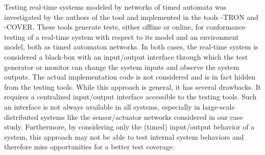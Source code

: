 Testing real-time systems modeled by networks of timed automata was
investigated by the authors of the tool \uppaal
\cite{uppaaltron2008,uppaalcover2007,uppaaltron2005} and implemented
in the tools \uppaal-TRON
and
\uppaal-COVER. These tools generate
tests, either offline or online, for conformance testing of a
real-time system with respect to its model and an environment model,
both as timed automaton networks.  In both cases, the real-time system
is considered a black-box with an input/output interface through which
the test generator or monitor can change the system inputs and observe
the system outputs.  The actual implementation code is not considered
and is in fact hidden from the testing tools.  While this approach is
general, it has several drawbacks.  It requires a centralized
input/output interface accessible to the testing tools.  Such an
interface is not always available in all systems, especially in
large-scale distributed systems like the sensor/actuator networks
considered in our case study.  Furthermore, by considering only the
(timed) input/output behavior of a system, this approach may not be
able to test internal system behaviors and therefore miss
opportunities for a better test
coverage.




